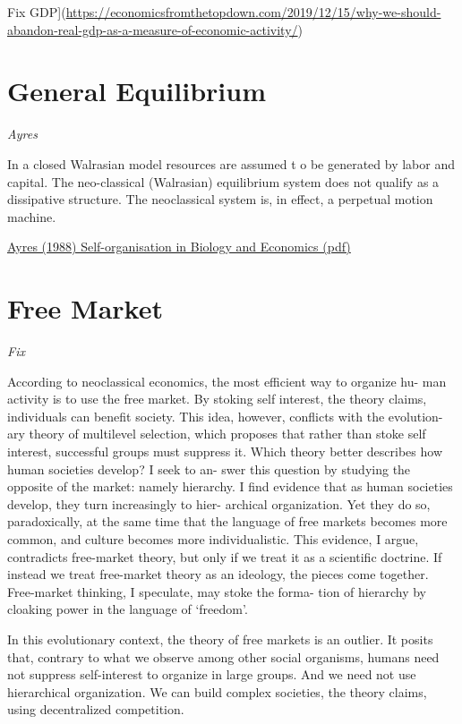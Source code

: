 \documentclass[
]{book}
\begin{document}
Fix GDP{]}(\url{https://economicsfromthetopdown.com/2019/12/15/why-we-should-abandon-real-gdp-as-a-measure-of-economic-activity/})

\hypertarget{general-equilibrium}{%
\section{General Equilibrium}\label{general-equilibrium}}

\emph{Ayres}

In a closed Walrasian model resources are assumed t o be generated by
labor and capital. The neo-classical (Walrasian) equilibrium system does not
qualify as a dissipative structure. The neoclassical system is, in effect,
a perpetual motion machine.

\href{pdf/Ayres_1988_Self-organistaion_in_Biology_and_Economics.pdf}{Ayres (1988) Self-organisation in Biology and Economics (pdf)}

\hypertarget{free-market}{%
\section{Free Market}\label{free-market}}

\emph{Fix}

According to neoclassical economics, the most efficient way to organize hu-
man activity is to use the free market. By stoking self interest, the theory claims,
individuals can benefit society. This idea, however, conflicts with the evolution-
ary theory of multilevel selection, which proposes that rather than stoke self
interest, successful groups must suppress it.
Which theory better describes how human societies develop? I seek to an-
swer this question by studying the opposite of the market: namely hierarchy. I
find evidence that as human societies develop, they turn increasingly to hier-
archical organization. Yet they do so, paradoxically, at the same time that the
language of free markets becomes more common, and culture becomes more
individualistic.
This evidence, I argue, contradicts free-market theory, but only if we treat it
as a scientific doctrine. If instead we treat free-market theory as an ideology, the
pieces come together. Free-market thinking, I speculate, may stoke the forma-
tion of hierarchy by cloaking power in the language of `freedom'.

In this evolutionary context, the theory of free markets is an outlier. It posits
that, contrary to what we observe among other social organisms, humans need
not suppress self-interest to organize in large groups. And we need not use
hierarchical organization. We can build complex societies, the theory claims,
using decentralized competition.
\end{document}
